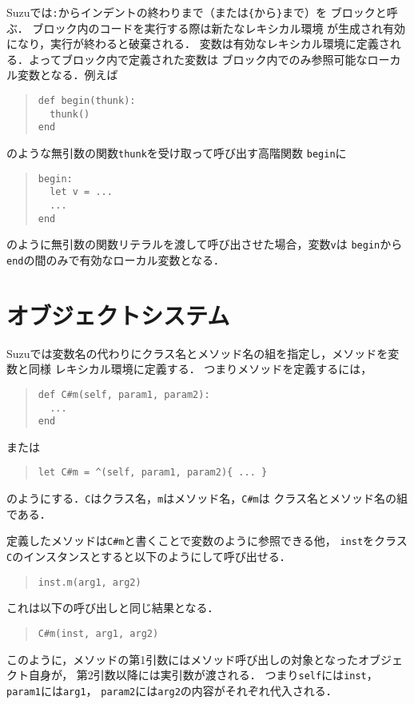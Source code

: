 \documentclass[a4paper,11pt,dvipdfmx]{jreport}
\begin{document}
Suzuでは\verb|:|からインデントの終わりまで（または\verb|{|から\verb|}|まで）を
ブロックと呼ぶ．
ブロック内のコードを実行する際は新たなレキシカル環境\cite{DesignConceptsInPL}
が生成され有効になり，実行が終わると破棄される．
変数は有効なレキシカル環境に定義される．よってブロック内で定義された変数は
ブロック内でのみ参照可能なローカル変数となる．例えば
\begin{quote}
\begin{verbatim}
def begin(thunk):
  thunk()
end
\end{verbatim}
\end{quote}
のような無引数の関数\verb|thunk|を受け取って呼び出す高階関数
\verb|begin|に
\begin{quote}
\begin{verbatim}
begin:
  let v = ...
  ...
end
\end{verbatim}
\end{quote}
のように無引数の関数リテラルを渡して呼び出させた場合，変数\verb|v|は
\verb|begin|から\verb|end|の間のみで有効なローカル変数となる．

\section{オブジェクトシステム}

Suzuでは変数名の代わりにクラス名とメソッド名の組を指定し，メソッドを変数と同様
レキシカル環境に定義する．
つまりメソッドを定義するには，
\begin{quote}
\begin{verbatim}
def C#m(self, param1, param2):
  ...
end
\end{verbatim}
\end{quote}
または
\begin{quote}
\begin{verbatim}
let C#m = ^(self, param1, param2){ ... }
\end{verbatim}
\end{quote}
のようにする．\verb|C|はクラス名，\verb|m|はメソッド名，\verb|C#m|は
クラス名とメソッド名の組である．

定義したメソッドは\verb|C#m|と書くことで変数のように参照できる他，
\verb|inst|をクラス\verb|C|のインスタンスとすると以下のようにして呼び出せる．
\begin{quote}
\begin{verbatim}
inst.m(arg1, arg2)
\end{verbatim}
\end{quote}
これは以下の呼び出しと同じ結果となる．
\begin{quote}
\begin{verbatim}
C#m(inst, arg1, arg2)
\end{verbatim}
\end{quote}
このように，メソッドの第1引数にはメソッド呼び出しの対象となったオブジェクト自身が，
第2引数以降には実引数が渡される．
つまり\verb|self|には\verb|inst|，\verb|param1|には\verb|arg1|，
\verb|param2|には\verb|arg2|の内容がそれぞれ代入される．
\end{document}
